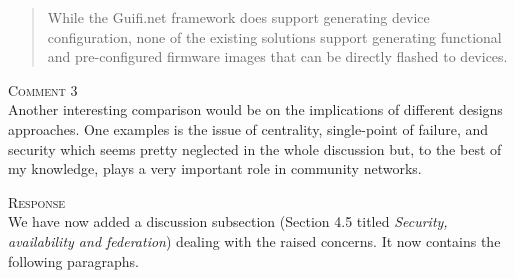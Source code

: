 \documentclass[12pt,twoside,a4paper]{report}
\begin{document}
\begin{quote}
While the Guifi.net framework does support generating device configuration, none of the existing solutions support generating functional and pre-configured firmware images that can be directly flashed to devices.
\end{quote}

\vspace{0.5cm}\noindent\textsc{Comment 3}\\
Another interesting comparison would be on the implications of different designs approaches. One examples is the issue of centrality, single-point of failure, and security which seems pretty neglected in the whole discussion but, to the best of my knowledge, plays a very important role in community networks.

\vspace{0.5cm}\noindent\textsc{Response}\\
We have now added a discussion subsection (Section 4.5 titled \textit{Security, availability and federation}) dealing with the raised concerns.
It now contains the following paragraphs.
\end{document}

